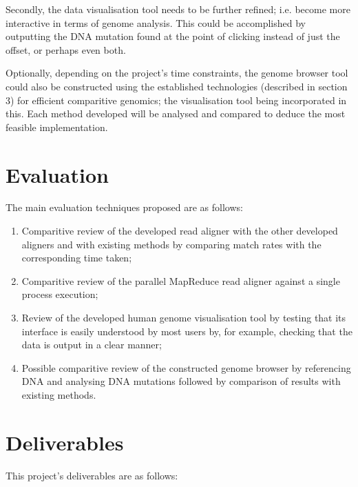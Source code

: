\documentclass{csfyp}
\begin{document}
\begin{small}
{{{Secondly, the data visualisation tool needs to be further refined; i.e. become more interactive in terms of genome analysis.  This could be accomplished by outputting the DNA mutation found at the point of clicking instead of just the offset, or perhaps even both.       

Optionally, depending on the project's time constraints, the genome browser tool could also be constructed using the established technologies (described in section 3) for efficient comparitive genomics; the visualisation tool being incorporated in this.  Each method developed will be analysed and compared to deduce the most feasible implementation.   


\section{Evaluation}\vspace{-3ex}

The main evaluation techniques proposed are as follows:

\begin{enumerate}[nolistsep]

  \item	Comparitive review of the developed read aligner with the other developed aligners and with existing methods by comparing match rates with the corresponding time taken;

  \item Comparitive review of the parallel MapReduce read aligner against a single process execution;  

  \item Review of the developed human genome visualisation tool by testing that its interface is easily understood by most users by, for example, checking that the data is output in a clear manner;

  \item Possible comparitive review of the constructed genome browser by referencing DNA and analysing DNA mutations followed by comparison of results with existing methods.

\end{enumerate}


\section{Deliverables}\vspace{-3ex}

This project's deliverables are as follows:

}}}
\end{small}
\end{document}
